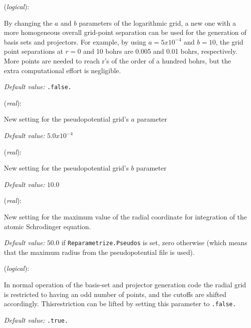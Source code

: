 \documentclass[11pt]{article}
\begin{document}
\begin{description}
\itemsep 10pt
\parsep 0pt

\item[{\bf Reparametrize.Pseudos}] ({\it logical}): 

By changing the $a$ and $b$ parameters of the logarithmic grid, a new one
with a more homogeneous overall grid-point separation can be used for
the generation of basis sets and projectors. For example, by using
$a=5x10^{-4}$ and $b=10$, the grid point separations at $r=0$ and 10 bohrs are
0.005 and 0.01 bohrs, respectively. More points are needed to reach r's of
the order of a hundred bohrs, but the extra computational effort is negligible.

{\it Default value:} { \tt .false.}

\item[{\bf New.A.Parameter}] ({\it real}):

New setting for the pseudopotential grid's $a$ parameter

{\it Default value:} { $5.0x10^{-4}$}

\item[{\bf New.B.Parameter}] ({\it real}):

New setting for the pseudopotential grid's $b$ parameter

{\it Default value:} { $10.0$}

\item[{\bf Rmax.Radial.Grid}] ({\it real}):

New setting for the maximum value of the radial coordinate for
integration of the atomic Schrodinger equation.

{\it Default value:} { $50.0$} if {\tt Reparametrize.Pseudos} is set,
zero otherwise (which means that the maximum radius from the pseudopotential
file is used).

\item[{\bf Restricted.Radial.Grid}] ({\it logical}): 

In normal operation of the basis-set and projector generation code the
radial grid is restricted to having an odd number of points, and the
cutoffs are shifted accordingly. Thisrestriction can be lifted by
setting this parameter to {\tt .false.}

{\it Default value:} { \tt .true.}
\end{description}
\end{document}
